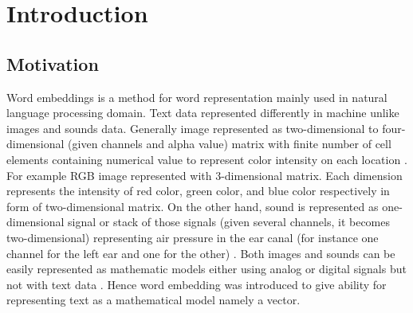 \chapter{Introduction}
\label{chap:intro}

\section{Motivation} 
    Word embeddings is a method for word representation mainly used in
    natural language processing domain. Text data represented
    differently in machine unlike images and sounds data. Generally
    image represented as two-dimensional to four-dimensional (given
    channels and alpha value) matrix with finite number of cell
    elements containing numerical value to represent color intensity
    on each location \citep{imageprocessing2018tyagi}. For example RGB
    image represented with 3-dimensional matrix. Each dimension
    represents the intensity of red color, green color, and blue color
    respectively in form of two-dimensional matrix. On the other hand,
    sound is represented as one-dimensional signal or stack of those
    signals (given several channels, it becomes two-dimensional)
    representing air pressure in the ear canal (for instance one
    channel for the left ear and one for the other)
    \citep{sound1995rocchesso}. Both images and sounds can be easily
    represented as mathematic models either using analog or digital
    signals but not with text data \citep{wordembedding2017yang}.
    Hence word embedding was introduced to give ability for
    representing text as a mathematical model namely a vector.
    

